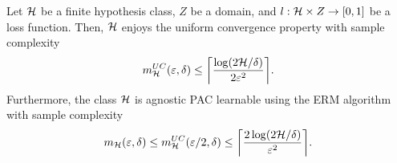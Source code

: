 \documentclass[11pt,a4paper]{article}
\begin{document}


\begin{proposition}
Let $\mathcal{H}$ be a finite hypothesis class, $Z$ be a domain, and $l:\mathcal{H}\times Z\rightarrow [0,1]$ be a loss function. Then, $\mathcal{H}$ enjoys the uniform convergence property with sample complexity
\begin{equation*}
m_{\mathcal{H}}^{UC}(\varepsilon,\delta)\le \bigg\lceil \dfrac{\log(2\mathcal{H}/\delta)}{2\varepsilon^2} \bigg\rceil.
\end{equation*}
Furthermore, the class $\mathcal{H}$ is agnostic PAC learnable using the ERM algorithm with sample complexity
\begin{equation*}
m_{\mathcal{H}}(\varepsilon,\delta)\le m_{\mathcal{H}}^{UC}(\varepsilon/2,\delta)\le \bigg\lceil \dfrac{2\log(2\mathcal{H}/\delta)}{\varepsilon^2} \bigg\rceil.
\end{equation*}
\end{proposition}
\end{document}
